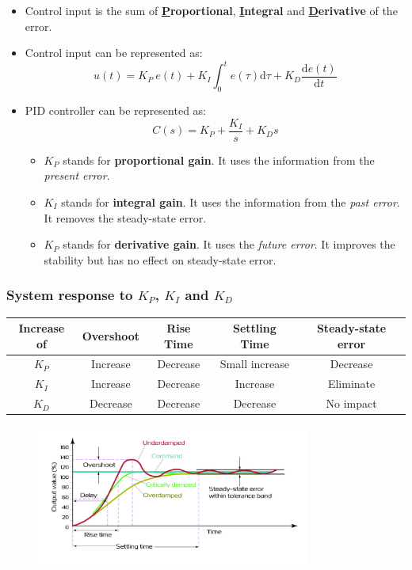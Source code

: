 \begin{itemize}
    \item Control input is the sum of \textbf{\underline{P}roportional}, \textbf{\underline{I}ntegral} and \textbf{\underline{D}erivative} of the error.
    
    \item Control input can be represented as:
    \[
    u(t) = K_{P}\  e(t)+K_{I}\int_{0}^{t}e(\tau)\mathrm{d}\tau + K_{D}\frac{\mathrm{d}e(t)}{\mathrm{d}t}
    \]
    
    \item PID controller can be represented as:
    \[C(s) =K_{P}+\frac{K_{I}}{s}+K_{D}s \]
    
        \begin{itemize}
             \item $K_{P}$ stands for \textbf{proportional gain}. It uses the information from the \textit{present error}.
             \item $K_{I}$ stands for \textbf{integral gain}. It uses the information from the \textit{past error}.
             It removes the steady-state error.
             \item $K_{P}$ stands for \textbf{derivative gain}. It uses the \textit{future error}. It improves the stability but has no effect on steady-state error.
        \end{itemize}
\end{itemize}

\subsubsection{System response to $K_{P}$, $K_{I}$ and $K_{D}$}
\begin{table}[H] \centering
    \begin{tabular}{|c|c|c|c|c|} \hline
        \textbf{Increase of} &\textbf{Overshoot}& \textbf{Rise Time} &\textbf{Settling Time}& \textbf{Steady-state error}\\ \hline
        $K_{P}$&Increase&  Decrease& Small increase& Decrease\\ \hline
        $K_{I}$&Increase &Decrease& Increase& Eliminate\\ \hline
        $K_{D}$&Decrease& Decrease& Decrease& No impact\\ \hline
    \end{tabular}
\end{table}

\begin{figure}[H] 
    \centering
    \includegraphics[width=0.8\textwidth]{images/PID_response.jpg}
\end{figure}
